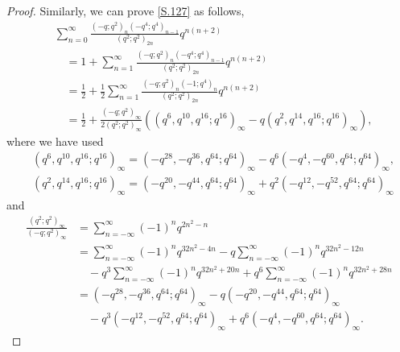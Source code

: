 \documentclass[reqno,12pt]{amsart}
\theoremstyle{remark}
\numberwithin{equation}{section}
\begin{document}
\begin{proof}
Similarly, we can prove \eqref{S.127} as follows,
\begin{align*}
&\sum_{n=0}^{\infty}\frac{\left(-q;q^2\right)_n
\left(-q^4;q^4\right)_{n-1}}
{\left(q^2;q^2\right)_{2n}}q^{n\left(n+2\right)}\nonumber\\
&\quad=1+\sum_{n=1}^{\infty}\frac{\left(-q;q^2\right)_n
\left(-q^4;q^4\right)_{n-1}}
{\left(q^2;q^2\right)_{2n}}q^{n\left(n+2\right)}\nonumber\\
&\quad=\frac{1}{2}+\frac{1}{2}\sum_{n=1}^{\infty}\frac{\left(-q;q^2\right)_n
\left(-1;q^4\right)_{n}}
{\left(q^2;q^2\right)_{2n}}q^{n\left(n+2\right)}\nonumber\\
&\quad=\frac{1}{2}+\frac{\left(-q;q^2\right)_{\infty}
}
{2\left(q^2;q^2\right)_{\infty}}\left(\left(q^6,q^{10},q^{16};q^{16}\right)_{\infty}
-q\left(q^2,q^{14},q^{16};q^{16}\right)_{\infty}\right),
\end{align*}
where we have used
\begin{align*}
&\left(q^6,q^{10},q^{16};q^{16}\right)_{\infty}
=\left(-q^{28},-q^{36},q^{64};q^{64}\right)_{\infty}
-q^6\left(-q^{4},-q^{60},q^{64};q^{64}\right)_{\infty},
\\
&\left(q^2,q^{14},q^{16};q^{16}\right)_{\infty}
=\left(-q^{20},-q^{44},q^{64};q^{64}\right)_{\infty}
+q^2\left(-q^{12},-q^{52},q^{64};q^{64}\right)_{\infty}
\end{align*}
and
\begin{align*}
\frac{\left(q^2;q^2\right)_{\infty}}{\left(-q;q^2\right)_{\infty}}
&=\sum_{n=-\infty}^{\infty}\left(-1\right)^nq^{2n^2-n}\\
&=\sum_{n=-\infty}^{\infty}\left(-1\right)^nq^{32n^2-4n}
-q\sum_{n=-\infty}^{\infty}\left(-1\right)^nq^{32n^2-12n}\\
&\quad-q^3\sum_{n=-\infty}^{\infty}\left(-1\right)^nq^{32n^2+20n}
+q^6\sum_{n=-\infty}^{\infty}\left(-1\right)^nq^{32n^2+28n}\\
&=\left(-q^{28},-q^{36},q^{64};q^{64}\right)_{\infty}
-q\left(-q^{20},-q^{44},q^{64};q^{64}\right)_{\infty}\\
&\quad-q^3\left(-q^{12},-q^{52},q^{64};q^{64}\right)_{\infty}
+q^6\left(-q^{4},-q^{60},q^{64};q^{64}\right)_{\infty}.
\end{align*}
\end{proof}
\end{document}
